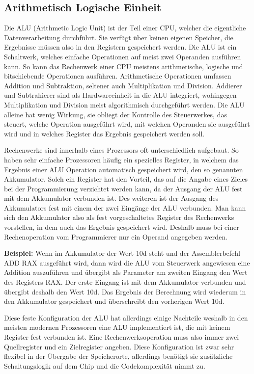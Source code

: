 \documentclass[12pt]{article}
\begin{document}
\subsection{Arithmetisch Logische Einheit}
Die ALU (Arithmetic Logic Unit) ist der Teil einer CPU, welcher die eigentliche Datenverarbeitung durchführt. Sie verfügt über keinen eigenen Speicher, die Ergebnisse müssen also in den Registern gespeichert werden. Die ALU ist ein Schaltwerk, welches einfache Operationen auf meist zwei Operanden ausführen kann. So kann das Rechenwerk einer CPU meistens arithmetische, logische und bitschiebende Operationen ausführen. Arithmetische Operationen umfassen Addition und Subtraktion, seltener auch Multiplikation und Division. Addierer und Subtrahierer sind als Hardwareeinheit in die ALU integriert, wohingegen Multiplikation und Division meist algorithmisch durchgeführt werden. Die ALU alleine hat wenig Wirkung, sie obliegt der Kontrolle des Steuerwerkes, das steuert, welche Operation ausgeführt wird, mit welchen Operanden sie ausgeführt wird und in welches Register das Ergebnis gespeichert werden soll.

Rechenwerke sind innerhalb eines Prozessors oft unterschiedlich aufgebaut. 
So haben sehr einfache Prozessoren häufig ein spezielles Register, in welchem das Ergebnis einer ALU Operation automatisch gespeichert wird, den so genannten Akkumulator. Solch ein Register hat den Vorteil, das auf die Angabe eines Zieles bei der Programmierung verzichtet werden kann, da der Ausgang der ALU fest mit dem Akkumulator verbunden ist. Des weiteren ist der Ausgang des Akkumulators fest mit einem der zwei Eingänge der ALU verbunden. Man kann sich den Akkumulator also als fest vorgeschaltetes Register des Rechenwerks vorstellen, in dem auch das Ergebnis gespeichert wird. Deshalb muss bei einer Rechenoperation vom Programmierer nur ein Operand angegeben werden. 

\noindent \textbf{Beispiel:} Wenn im Akkumulator der Wert 10d steht und der Assemblerbefehl ADD RAX ausgeführt wird, dann wird die ALU vom Steuerwerk angewiesen eine Addition auszuführen und übergibt als Parameter am zweiten Eingang den Wert des Registers RAX. Der erste Eingang ist mit dem Akkumulator verbunden und übergibt deshalb den Wert 10d. Das Ergebnis der Berechnung wird wiederum in den Akkumulator gespeichert und überschreibt den vorherigen Wert 10d.  

Diese feste Konfiguration der ALU hat allerdings einige Nachteile weshalb in den meisten modernen Prozessoren eine ALU implementiert ist, die mit keinem Register fest verbunden ist. Eine Rechenwerksoperation muss also immer zwei Quellregister und ein Zielregister angeben. Diese Konfiguration ist zwar sehr flexibel in der Übergabe der Speicherorte, allerdings benötigt sie zusätzliche Schaltungslogik auf dem Chip und die Codekomplexität nimmt zu.
\end{document}
